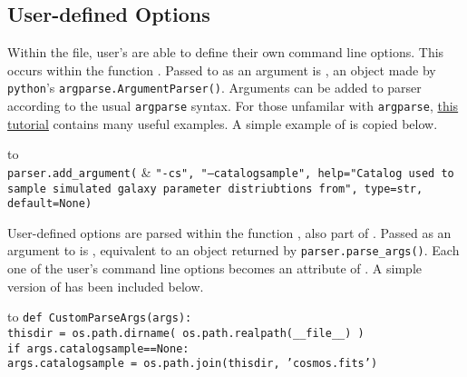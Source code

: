 \documentclass[12pt]{article}
\begin{document}
\optstab{}

\subsection{User-defined Options}
\label{sec:user}

Within the \config{} file, user's are able to
define their own command line options. This occurs
within the function \argsfunc{}. Passed
to \argsfunc{}  as an argument is \argsparser{},
an object made by \texttt{python}'s
\texttt{argparse.ArgumentParser()}. Arguments
can be added to parser according to the usual
\texttt{argparse} syntax.
For those unfamilar with \texttt{argparse},
\href{http://docs.python.org/2/howto/argparse.html}{this tutorial}
contains many useful examples. A simple example of
\argsfunc{} is copied below.

\setlength{\tabcolsep}{0pt}
\begin{longtabu*} to \linewidth {l X}
\\
\hspace{20pt} \texttt{parser.add\_argument(} & \texttt{"-cs", "--catalogsample", help="Catalog used to
sample simulated galaxy parameter distriubtions from", type=str, default=None)}
\end{longtabu*}
\setlength{\tabcolsep}{6pt}
\addtocounter{table}{-1}


User-defined options are parsed within the function \parsefunc{},
also part of \config{}.
Passed as an argument to \parsefunc{} is \parseargs{}, equivalent
to an object returned by \texttt{parser.parse\_args()}. Each one of the user's 
command line options becomes an attribute of \parseargs{}. 
A simple version of \parsefunc{} has been included below.

\setlength{\tabcolsep}{0pt}
\begin{longtabu*} to \linewidth {X}
\texttt{def CustomParseArgs(args):}\\
\hspace{20pt} \texttt{thisdir = os.path.dirname( os.path.realpath(\_\_file\_\_) )} \\
\hspace{20pt} \texttt{if args.catalogsample==None:} \\
\hspace{40pt} \texttt{args.catalogsample = os.path.join(thisdir, 'cosmos.fits')}
\end{longtabu*}
\setlength{\tabcolsep}{6pt}
\addtocounter{table}{-1}
\end{document}
